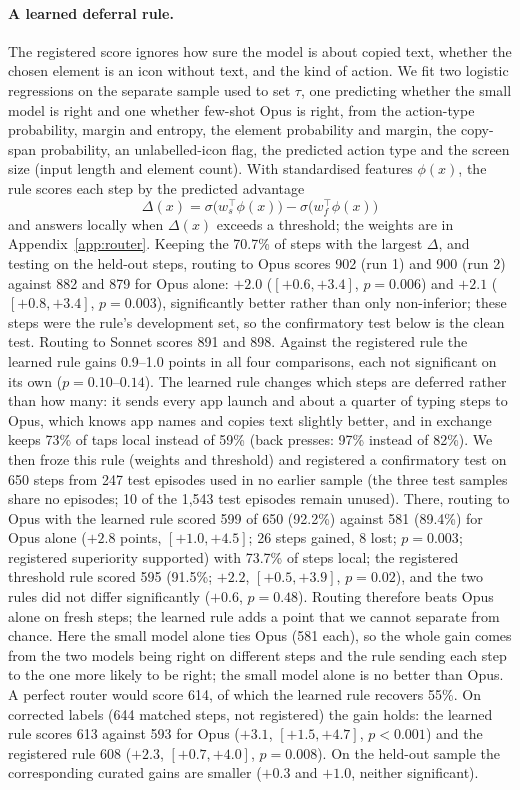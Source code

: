 \documentclass[10pt]{article}
\begin{document}
\paragraph{A learned deferral rule.} The registered score ignores how sure the model is about copied text, whether the chosen element is an icon without text, and the kind of action. We fit two logistic regressions on the separate sample used to set $\tau$, one predicting whether the small model is right and one whether few-shot Opus is right, from the action-type probability, margin and entropy, the element probability and margin, the copy-span probability, an unlabelled-icon flag, the predicted action type and the screen size (input length and element count). With standardised features $\phi(x)$, the rule scores each step by the predicted advantage
\[ \Delta(x) = \sigma\big(w_s^\top \phi(x)\big) - \sigma\big(w_f^\top \phi(x)\big) \]
and answers locally when $\Delta(x)$ exceeds a threshold; the weights are in Appendix~\ref{app:router}. Keeping the 70.7\% of steps with the largest $\Delta$, and testing on the held-out steps, routing to Opus scores 902 (run 1) and 900 (run 2) against 882 and 879 for Opus alone: $+2.0$ ($[+0.6, +3.4]$, $p=0.006$) and $+2.1$ ($[+0.8, +3.4]$, $p=0.003$), significantly better rather than only non-inferior; these steps were the rule's development set, so the confirmatory test below is the clean test. Routing to Sonnet scores 891 and 898. Against the registered rule the learned rule gains 0.9--1.0 points in all four comparisons, each not significant on its own ($p=0.10$--$0.14$). The learned rule changes which steps are deferred rather than how many: it sends every app launch and about a quarter of typing steps to Opus, which knows app names and copies text slightly better, and in exchange keeps 73\% of taps local instead of 59\% (back presses: 97\% instead of 82\%). We then froze this rule (weights and threshold) and registered a confirmatory test on 650 steps from 247 test episodes used in no earlier sample (the three test samples share no episodes; 10 of the 1{,}543 test episodes remain unused). There, routing to Opus with the learned rule scored 599 of 650 (92.2\%) against 581 (89.4\%) for Opus alone ($+2.8$ points, $[+1.0, +4.5]$; 26 steps gained, 8 lost; $p=0.003$; registered superiority supported) with 73.7\% of steps local; the registered threshold rule scored 595 (91.5\%; $+2.2$, $[+0.5, +3.9]$, $p=0.02$), and the two rules did not differ significantly ($+0.6$, $p=0.48$). Routing therefore beats Opus alone on fresh steps; the learned rule adds a point that we cannot separate from chance. Here the small model alone ties Opus (581 each), so the whole gain comes from the two models being right on different steps and the rule sending each step to the one more likely to be right; the small model alone is no better than Opus. A perfect router would score 614, of which the learned rule recovers 55\%. On corrected labels (644 matched steps, not registered) the gain holds: the learned rule scores 613 against 593 for Opus ($+3.1$, $[+1.5, +4.7]$, $p<0.001$) and the registered rule 608 ($+2.3$, $[+0.7, +4.0]$, $p=0.008$). On the held-out sample the corresponding curated gains are smaller ($+0.3$ and $+1.0$, neither significant).
\end{document}
